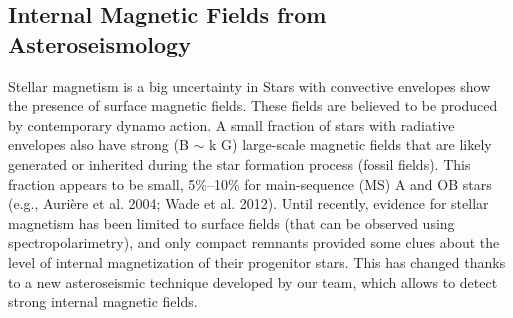 {\color{red}\subsection{Internal Magnetic Fields from Asteroseismology}}
Stellar magnetism is a big uncertainty in 
Stars with convective envelopes show the presence of
surface magnetic fields. These fields are believed to be produced by contemporary dynamo action.
A small fraction of stars with radiative envelopes also have strong (B $\sim$ k G)
large-scale magnetic fields that are likely generated or inherited during the star
formation process (fossil fields). 
This fraction appears to be small, 5\%–10\% for main-sequence (MS) A and OB stars (e.g., Aurière et al. 2004; Wade et al. 2012). 
Until recently, evidence for stellar magnetism has been limited to surface fields (that can be observed using spectropolarimetry),
and only compact remnants provided some clues about the level of internal magnetization of their progenitor stars.
This has changed thanks to a new asteroseismic technique developed by our team, which allows to detect strong internal magnetic fields.